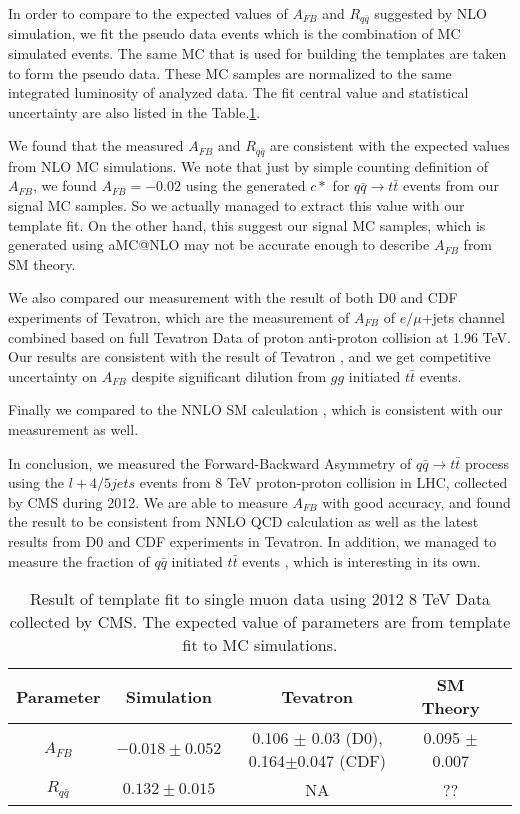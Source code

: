 \documentclass{cmspaperpdf}
\begin{document}
In order to compare to the expected values of $A_{FB}$ and $R_{q\bar{q}}$ suggested by NLO simulation, we fit the pseudo data events which is the combination of MC simulated events. The same MC that is used for building the templates are taken to form the pseudo data. These MC samples are normalized to the same integrated luminosity of analyzed data. The fit central value and statistical uncertainty are also listed in the Table.\ref{tab:result_ref}.

We found that the measured $A_{FB}$ and $R_{q\bar{q}}$ are consistent with the expected values from NLO MC simulations. We note that just by simple counting definition of $A_{FB}$, we found $A_{FB}=-0.02$ using the generated $c*$ for $q\bar{q}\rightarrow t\bar t$ events from our signal MC samples. So we actually managed to extract this value with our template fit. On the other hand, this suggest our signal MC samples, which is generated using aMC@NLO may not be accurate enough to describe $A_{FB}$ from SM theory.

We also compared our measurement with the result of both D0 and CDF experiments of Tevatron, which are the measurement of $A_{FB}$ of $e/\mu$+jets channel combined based on full Tevatron Data of proton anti-proton collision at 1.96 TeV. Our results are consistent with the result of Tevatron \cite{d0,CDF2016}, and we get competitive uncertainty on $A_{FB}$ despite significant dilution from $gg$ initiated $t\bar{t}$ events. 

Finally we compared to the NNLO SM calculation \cite{Czakon:2014xsa}, which is consistent with our measurement as well. 

In conclusion, we measured the Forward-Backward Asymmetry of $q\bar q\rightarrow t\bar t$ process using the $l+4/5jets$ events from 8 TeV proton-proton collision in LHC, collected by CMS during 2012. We are able to measure $A_{FB}$ with good accuracy, and found the result to be consistent from NNLO QCD calculation as well as the latest results from D0 and CDF experiments in Tevatron. In addition, we managed to measure the fraction of $q\bar{q}$ initiated $t\bar{t}$ events , which is interesting in its own.



\begin{table}[hbt]
\begin{center}
\begin{tabular}{c|cccc}\hline
Parameter                 & Simulation   & Tevatron & SM Theory  \\
\hline
$A_{FB}$					  & $-0.018 \pm 0.052 $  & 0.106 $\pm$ 0.03 (D0), 0.164$\pm$0.047 (CDF)  &  0.095 $\pm$ 0.007\\
$R_{q\bar{q}}$			  & $ 0.132 \pm 0.015 $  & NA & ?? \\
\end{tabular}
\end{center}
\label{tab:result_ref}
\caption{Result of template fit to single muon data using 2012 8 TeV Data collected by CMS.  The expected value of parameters are from template fit to MC simulations. }
\end{table}
\end{document}
